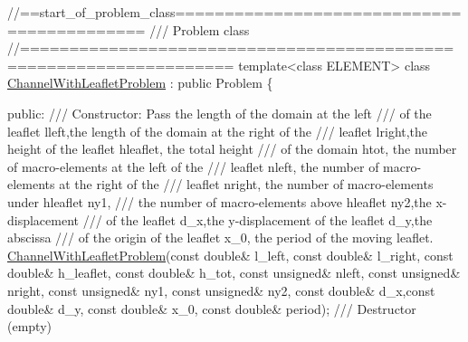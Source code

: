  
\begin{DoxyCodeInclude}
\textcolor{comment}{//==start\_of\_problem\_class===========================================}
\textcolor{comment}{/// Problem class}
\textcolor{comment}{}\textcolor{comment}{//===================================================================}
\textcolor{keyword}{template}<\textcolor{keyword}{class} ELEMENT>
\textcolor{keyword}{class }\hyperlink{classChannelWithLeafletProblem}{ChannelWithLeafletProblem} : \textcolor{keyword}{public} Problem
\{

\textcolor{keyword}{public}:
\textcolor{comment}{}
\textcolor{comment}{ /// Constructor: Pass the length of the domain at the left}
\textcolor{comment}{ /// of the leaflet lleft,the length of the domain at the right of the}
\textcolor{comment}{ /// leaflet lright,the height of the leaflet hleaflet, the total height}
\textcolor{comment}{ /// of the domain htot, the number of macro-elements at the left of the}
\textcolor{comment}{ /// leaflet nleft, the number of macro-elements at the right of the}
\textcolor{comment}{ /// leaflet nright, the number of macro-elements under hleaflet ny1,}
\textcolor{comment}{ /// the number of macro-elements above hleaflet ny2,the x-displacement}
\textcolor{comment}{ /// of the leaflet d\_x,the y-displacement of the leaflet d\_y,the abscissa }
\textcolor{comment}{ /// of the origin of the leaflet x\_0, the period of the moving leaflet.}
\textcolor{comment}{} \hyperlink{classChannelWithLeafletProblem_a3c5a4c97ec66fe53bc130005c74a47b5}{ChannelWithLeafletProblem}(\textcolor{keyword}{const} \textcolor{keywordtype}{double}& l\_left,
                           \textcolor{keyword}{const} \textcolor{keywordtype}{double}& l\_right, \textcolor{keyword}{const} \textcolor{keywordtype}{double}& h\_leaflet,
                           \textcolor{keyword}{const} \textcolor{keywordtype}{double}& h\_tot,
                           \textcolor{keyword}{const} \textcolor{keywordtype}{unsigned}& nleft, \textcolor{keyword}{const} \textcolor{keywordtype}{unsigned}& nright,
                           \textcolor{keyword}{const} \textcolor{keywordtype}{unsigned}& ny1, \textcolor{keyword}{const} \textcolor{keywordtype}{unsigned}&  ny2,
                           \textcolor{keyword}{const} \textcolor{keywordtype}{double}& d\_x,\textcolor{keyword}{const} \textcolor{keywordtype}{double}& d\_y,
                           \textcolor{keyword}{const} \textcolor{keywordtype}{double}& x\_0, \textcolor{keyword}{const} \textcolor{keywordtype}{double}& period);  
\textcolor{comment}{}
\textcolor{comment}{ /// Destructor (empty)}

\end{DoxyCodeInclude}
